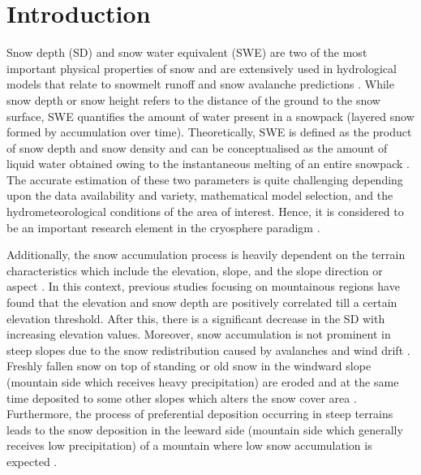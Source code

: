 \documentclass[review]{elsarticle}
\numberwithin{equation}{section}
\numberwithin{figure}{section}
\numberwithin{table}{section}
\begin{document}
\linenumbers

\section{Introduction}
\label{sec:Intro}

Snow depth (SD) and snow water equivalent (SWE) are two of the most important physical properties of snow and are extensively used in hydrological models that relate to snowmelt runoff and snow avalanche predictions \citep{Thakur2017}. While snow depth or snow height refers to the distance of the ground to the snow surface, SWE quantifies the amount of water present in a snowpack (layered snow formed by accumulation over time). Theoretically, SWE is defined as the product of snow depth and snow density and can be conceptualised as the amount of liquid water obtained owing to the instantaneous melting of
an entire snowpack \citep{Tedesco2015}. The accurate estimation of these two parameters is quite challenging depending upon the data availability and variety, mathematical model selection, and the hydrometeorological conditions of the area of interest. Hence, it is considered to be an important research element in the cryosphere paradigm \citep{Leinss2014, Leinss2015, Leinss2016}.

Additionally, the snow accumulation process is heavily dependent on the terrain characteristics which include the elevation, slope, and the slope direction or aspect \citep{Grunewald2014, Jain2009, Negi2009, Srinivasulu2004, Zheng2016}. In this context, previous studies focusing on mountainous regions \citep{Grunewald2014, Jain2009} have found that the elevation and snow depth are positively correlated till a certain elevation threshold. After this, there is a significant decrease in the SD with increasing elevation values. Moreover, snow accumulation is not prominent in steep slopes due to the snow redistribution caused by avalanches and wind drift \citep{Grunewald2014}. Freshly fallen snow on top of standing or old snow in the windward slope (mountain side which receives heavy precipitation) are eroded and at the same time deposited to some other slopes which alters the snow cover area \citep{Lehning2008}. Furthermore, the process of preferential deposition occurring in steep terrains leads to the snow deposition in the leeward side (mountain side which generally receives low precipitation) of a mountain where low snow accumulation is expected \citep{Lehning2008}.
\end{document}
